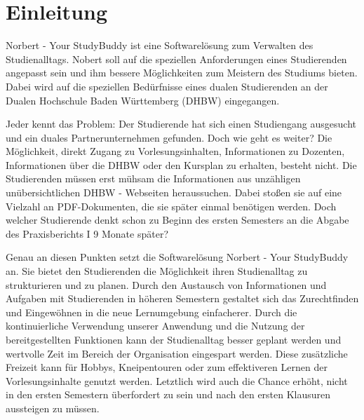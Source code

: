 
\chapter{Einleitung}
Norbert - Your StudyBuddy ist eine Softwarelösung zum Verwalten des Studienalltags. Nobert soll auf die speziellen Anforderungen eines Studierenden angepasst sein und ihm bessere Möglichkeiten zum Meistern des Studiums bieten. Dabei wird auf die speziellen Bedürfnisse eines dualen Studierenden an der Dualen Hochschule Baden Württemberg (DHBW) eingegangen.

Jeder kennt das Problem: Der Studierende hat sich einen Studiengang ausgesucht und ein duales Partnerunternehmen gefunden. Doch wie geht es weiter? Die Möglichkeit, direkt Zugang zu Vorlesungsinhalten, Informationen zu Dozenten, Informationen über die DHBW oder den Kursplan zu erhalten, besteht nicht. Die Studierenden müssen erst mühsam die Informationen aus unzähligen unübersichtlichen DHBW - Webseiten heraussuchen. Dabei stoßen sie auf eine Vielzahl an PDF-Dokumenten, die sie später einmal benötigen werden. Doch welcher Studierende denkt schon zu Beginn des ersten Semesters an die Abgabe des Praxisberichts I 9 Monate später?

Genau an diesen Punkten setzt die Softwarelösung Norbert - Your StudyBuddy an. Sie bietet den Studierenden die Möglichkeit ihren Studienalltag zu strukturieren und zu planen. Durch den Austausch von Informationen und Aufgaben mit Studierenden in höheren Semestern gestaltet sich das Zurechtfinden und Eingewöhnen in die neue Lernumgebung einfacherer. Durch die kontinuierliche Verwendung unserer Anwendung und die Nutzung der bereitgestellten Funktionen kann der Studienalltag besser geplant werden und wertvolle Zeit im Bereich der Organisation eingespart werden. Diese zusätzliche Freizeit kann für Hobbys, Kneipentouren oder zum effektiveren Lernen der Vorlesungsinhalte genutzt werden. Letztlich wird auch die Chance erhöht, nicht in den ersten Semestern überfordert zu sein und nach den ersten Klausuren aussteigen zu müssen. 
